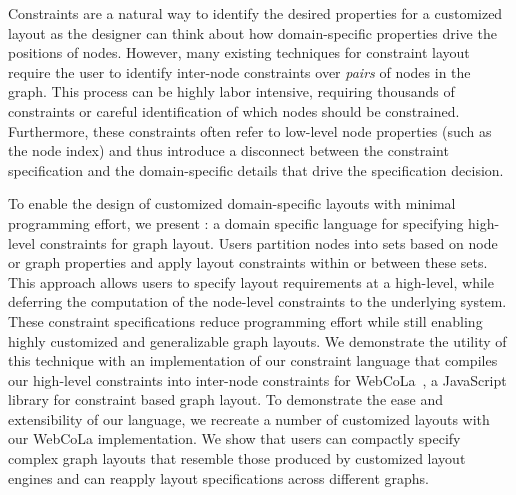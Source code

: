 Constraints are a natural way to identify the desired properties for a
customized layout as the designer can think about how domain-specific
properties drive the positions of nodes. However, many existing techniques
for constraint layout require the user to identify inter-node constraints
over \emph{pairs} of nodes in the graph. This process can be highly labor
intensive, requiring thousands of constraints or careful identification of
which nodes should be constrained. Furthermore, these constraints often
refer to low-level node properties (such as the node index) and thus
introduce a disconnect between the constraint specification and the
domain-specific details that drive the specification decision.


To enable the design of customized domain-specific layouts with minimal
programming effort, we present \projectname: a domain specific language for
specifying high-level constraints for graph layout. Users partition nodes
into sets based on node or graph properties and apply layout constraints
within or between these sets. This approach allows users to specify layout
requirements at a high-level, while deferring the computation of the
node-level constraints to the underlying system. These constraint
specifications reduce programming effort while still enabling highly
customized and generalizable graph layouts. We demonstrate the utility of
this technique with an implementation of our constraint language that
compiles our high-level constraints into inter-node constraints for
WebCoLa~\cite{WebCoLa}, a JavaScript library for constraint based graph
layout. To demonstrate the ease and extensibility of our language, we
recreate a number of customized layouts with our WebCoLa implementation. We
show that users can compactly specify complex graph layouts that resemble
those produced by customized layout engines and can reapply layout
specifications across different graphs.
